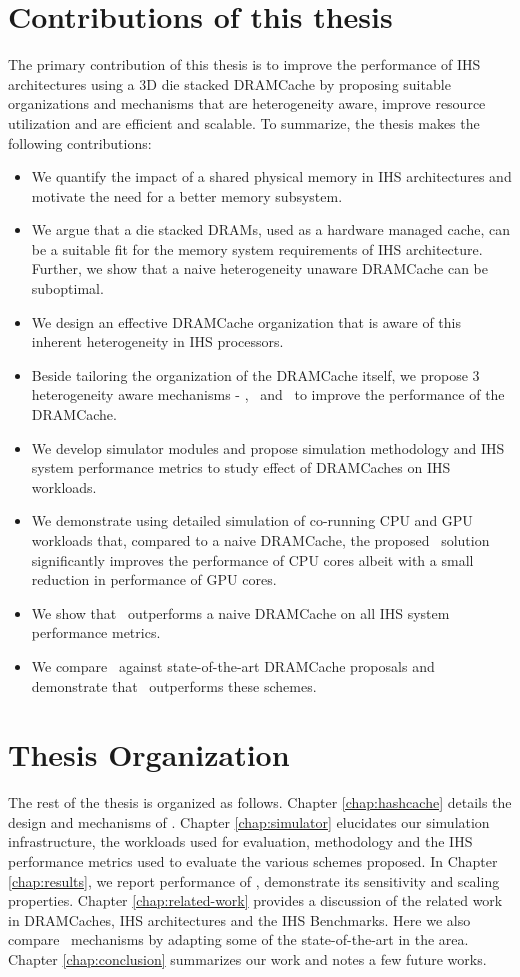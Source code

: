\section{Contributions of this thesis}
The primary contribution of this thesis is to improve the performance of IHS architectures using a 3D die stacked DRAMCache by proposing suitable organizations and mechanisms that are heterogeneity aware, improve resource utilization and are efficient and scalable. To summarize, the thesis makes the following contributions:
\begin{itemize}
	\item We quantify the impact of a shared physical memory in IHS architectures and motivate the need for a better memory subsystem.
	\item We argue that a die stacked DRAMs, used as a hardware managed cache, can be a suitable fit for the memory system requirements of IHS architecture. Further, we show that a naive heterogeneity unaware DRAMCache can be suboptimal.
	\item We design an effective DRAMCache organization that is aware of this inherent heterogeneity in IHS processors.
	\item Beside tailoring the organization of the DRAMCache itself, we propose 3 heterogeneity aware mechanisms - \prioname, \bypassname\ and \chaining\ to improve the performance of the DRAMCache.
	\item We develop simulator modules and propose simulation methodology and IHS system performance metrics to study effect of DRAMCaches on IHS workloads.	
	\item We demonstrate using detailed simulation of co-running CPU and GPU workloads that, compared to a naive DRAMCache, the proposed \cachename\ solution significantly improves the performance of CPU cores albeit with a small reduction in performance of GPU cores.
	\item We show that \cachename\ outperforms a naive DRAMCache on all IHS system performance metrics.
	\item We compare \cachename\ against state-of-the-art DRAMCache proposals and demonstrate that \cachename\ outperforms these schemes.
\end{itemize}

\section{Thesis Organization}
The rest of the thesis is organized as follows. Chapter \ref{chap:hashcache} details the design and mechanisms of \cachename.
Chapter \ref{chap:simulator} elucidates our simulation infrastructure, the workloads used for evaluation, methodology and the IHS performance metrics used to evaluate the various schemes proposed. 
In Chapter \ref{chap:results}, we report performance of \cachename, demonstrate its sensitivity and scaling properties. Chapter \ref{chap:related-work} provides a discussion of the related work in DRAMCaches, IHS architectures and the IHS Benchmarks. Here we also compare \cachename\ mechanisms by adapting some of the state-of-the-art in the area. Chapter \ref{chap:conclusion} summarizes our work and notes a few future works.